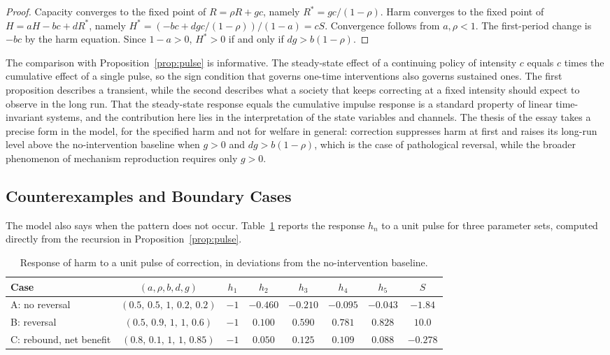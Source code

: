 \documentclass[12pt]{article}
\theoremstyle{remark}
\begin{document}
\begin{proof}
Capacity converges to the fixed point of $R = \rho R + gc$, namely $R^{*} = gc/(1-\rho)$. Harm converges to the fixed point of $H = aH - bc + dR^{*}$, namely $H^{*} = (-bc + dgc/(1-\rho))/(1-a) = cS$. Convergence follows from $a, \rho < 1$. The first-period change is $-bc$ by the harm equation. Since $1-a>0$, $H^{*}>0$ if and only if $dg > b(1-\rho)$.
\end{proof}

The comparison with Proposition~\ref{prop:pulse} is informative. The steady-state effect of a continuing policy of intensity $c$ equals $c$ times the cumulative effect of a single pulse, so the sign condition that governs one-time interventions also governs sustained ones. The first proposition describes a transient, while the second describes what a society that keeps correcting at a fixed intensity should expect to observe in the long run. That the steady-state response equals the cumulative impulse response is a standard property of linear time-invariant systems, and the contribution here lies in the interpretation of the state variables and channels. The thesis of the essay takes a precise form in the model, for the specified harm and not for welfare in general: correction suppresses harm at first and raises its long-run level above the no-intervention baseline when $g > 0$ and $dg > b(1-\rho)$, which is the case of pathological reversal, while the broader phenomenon of mechanism reproduction requires only $g > 0$.

\subsection{Counterexamples and Boundary Cases}

The model also says when the pattern does not occur. Table~\ref{tab:cases} reports the response $h_n$ to a unit pulse for three parameter sets, computed directly from the recursion in Proposition~\ref{prop:pulse}.

\begin{table}[ht]
\centering
\small
\setlength{\tabcolsep}{4pt}
\begin{tabular}{lccccccc}
\hline
Case & $(a,\rho,b,d,g)$ & $h_1$ & $h_2$ & $h_3$ & $h_4$ & $h_5$ & $S$ \\
\hline
A: no reversal & $(0.5,\,0.5,\,1,\,0.2,\,0.2)$ & $-1$ & $-0.460$ & $-0.210$ & $-0.095$ & $-0.043$ & $-1.84$ \\
B: reversal & $(0.5,\,0.9,\,1,\,1,\,0.6)$ & $-1$ & $0.100$ & $0.590$ & $0.781$ & $0.828$ & $10.0$ \\
C: rebound, net benefit & $(0.8,\,0.1,\,1,\,1,\,0.85)$ & $-1$ & $0.050$ & $0.125$ & $0.109$ & $0.088$ & $-0.278$ \\
\hline
\end{tabular}
\caption{Response of harm to a unit pulse of correction, in deviations from the no-intervention baseline.}
\label{tab:cases}
\end{table}
\end{document}
